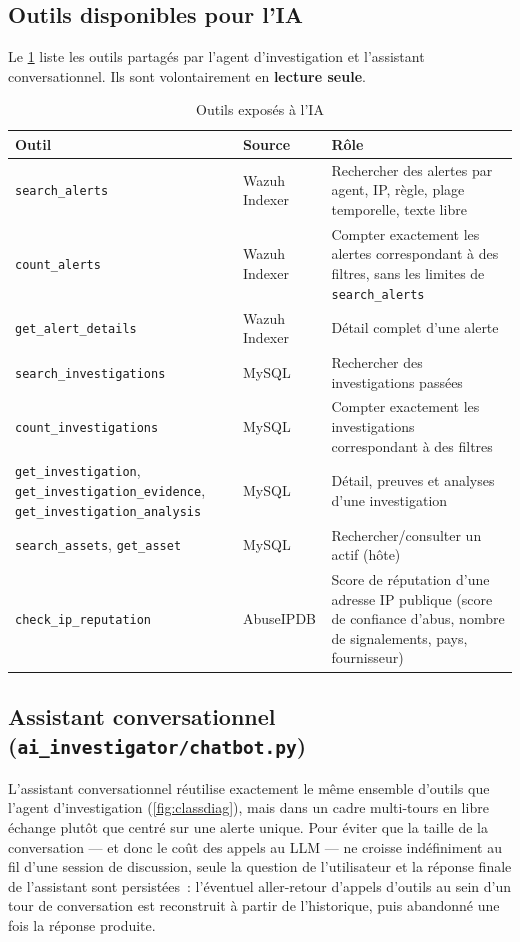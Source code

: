 \subsection{Outils disponibles pour l'IA}

Le \cref{tab:tools} liste les outils partagés par l'agent d'investigation
et l'assistant conversationnel. Ils sont volontairement en \textbf{lecture
seule}.

\begin{table}[H]
\centering
\caption{Outils exposés à l'IA}
\label{tab:tools}
\begin{tabular}{@{}p{3.6cm}p{3cm}p{7cm}@{}}
\toprule
\textbf{Outil} & \textbf{Source} & \textbf{Rôle} \\
\midrule
\texttt{search\_alerts} & Wazuh Indexer & Rechercher des alertes par
agent, IP, règle, plage temporelle, texte libre \\
\texttt{count\_alerts} & Wazuh Indexer & Compter exactement les alertes
correspondant à des filtres, sans les limites de \texttt{search\_alerts} \\
\texttt{get\_alert\_details} & Wazuh Indexer & Détail complet d'une
alerte \\
\texttt{search\_investigations} & MySQL & Rechercher des investigations
passées \\
\texttt{count\_investigations} & MySQL & Compter exactement les
investigations correspondant à des filtres \\
\texttt{get\_investigation}, \texttt{get\_investigation\_evidence},
\texttt{get\_investigation\_analysis} & MySQL & Détail, preuves et
analyses d'une investigation \\
\texttt{search\_assets}, \texttt{get\_asset} & MySQL & Rechercher/consulter
un actif (hôte) \\
\texttt{check\_ip\_reputation} & AbuseIPDB \cite{abuseipdb} & Score de
réputation d'une adresse IP publique (score de confiance d'abus, nombre de
signalements, pays, fournisseur) \\
\bottomrule
\end{tabular}
\end{table}

\subsection{Assistant conversationnel (\texttt{ai\_investigator/chatbot.py})}

L'assistant conversationnel réutilise exactement le même ensemble d'outils
que l'agent d'investigation (\cref{fig:classdiag}), mais dans un cadre
multi-tours en libre échange plutôt que centré sur une alerte unique. Pour
éviter que la taille de la conversation — et donc le coût des appels au
LLM — ne croisse indéfiniment au fil d'une session de discussion, seule la
question de l'utilisateur et la réponse finale de l'assistant sont
persistées~: l'éventuel aller-retour d'appels d'outils au sein d'un tour de
conversation est reconstruit à partir de l'historique, puis abandonné une
fois la réponse produite.

